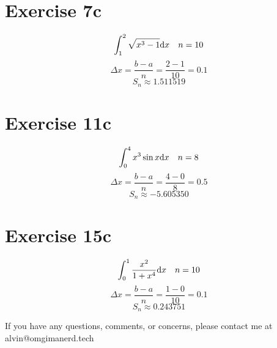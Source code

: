 \documentclass{math}
\begin{document}
\section*{Exercise 7c}
\[ \int_{1}^{2}{\sqrt{x^{3}-1}\mathrm{d}{x}} \quad n = 10 \]
\[ \Delta x = \frac{b-a}{n} = \frac{2-1}{10} = 0.1 \]
\[ S_{n} \approx 1.511519 \]

\section*{Exercise 11c}
\[ \int_{0}^{4}{x^{3}\sin{x}\mathrm{d}{x}} \quad n = 8 \]
\[ \Delta x = \frac{b-a}{n} = \frac{4-0}{8} = 0.5 \]
\[ S_{n} \approx -5.605350 \]

\section*{Exercise 15c}
\[ \int_{0}^{1}{\frac{x^{2}}{1+x^{4}}\mathrm{d}{x}} \quad n = 10 \]
\[ \Delta x = \frac{b-a}{n} = \frac{1-0}{10} = 0.1 \]
\[ S_{n} \approx 0.243751 \]

\begin{center}
  If you have any questions, comments, or concerns, please contact me at
  alvin@omgimanerd.tech
\end{center}
\end{document}
